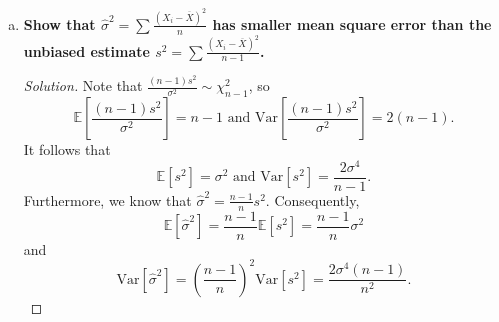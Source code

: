 \documentclass[11pt]{article}
\newenvironment{solution}
  {\renewcommand\qedsymbol{$\blacksquare$}\begin{proof}[Solution]}
  {\end{proof}}
\begin{document}
\begin{enumerate}
\begin{enumerate}[a)]
\begin{solution}
        The first equation is equivalent to $\sum (x_i - \mu) = 0$, so solving for $\mu$ gives
        \[
            \hat{\mu} = \frac{\sum x_i}{n} = \overline{x}.
        \]

        The second equation is equivalent to $\frac{n}{2\sigma^2} = \frac{1}{2\sigma^4} \sum (x_i - \mu)^2$, and solving for $\sigma^2$ gives 
        \begin{align*}
            \sigma^2 &= \frac{\sum (x_i - \mu)^2}{n}.
        \end{align*}
        Plugging in the MLE for $\mu$, we get the MLE for $\hat{\sigma}^2$:
        \begin{align*}
            \hat{\sigma}^2 &= \frac{\sum (x_i - \mu)^2}{n} \\
            &= \frac{1}{n} \left( \sum (x_i - \overline{x} )^2 \right).
        \end{align*}

        Similarly, if we find the MLE for $\sigma$, we get that
        \[
            \frac{\partial l}{\partial \sigma} = -\frac{n}{2} \frac{1}{2\pi \sigma^2} \cdot 4\pi \sigma - \frac{\sum(x_i - \mu)^2}{4\sigma^3}.
        \]
        Equating this to $0$, plugging in $\hat{\mu} = \overline{x}$, and solving for $\sigma$, we find that
        \[
            \sigma^2 = \frac{1}{n} \left( x_i - \overline{x}  \right)^2,
        \]
        so $\hat{\sigma} = \sqrt{\frac{1}{n} \left( x_i - \overline{x}  \right)^2} = \sqrt{\hat{\sigma}^2}$. Thus, the MLE for $\sigma$ is
        the square root of the MLE for $\sigma^2$, as desired. 
        \end{solution}
        
        \item \textbf{Show that $\hat{\sigma}^2 = \sum \frac{(X_i - \overline{X})^2}{n}$ has smaller mean square error than the unbiased estimate
        $s^2 = \sum \frac{(X_i - \overline{X})^2}{n-1}$. }

        \begin{solution}
        Note that $\frac{(n-1)s^2}{\sigma^2} \sim \chi_{n-1}^2$, so
        \[
            \mathbb{E}\left[ \frac{(n-1)s^2}{\sigma^2} \right] = n-1 \text{ and } \mathrm{Var} \left[\frac{(n-1)s^2}{\sigma^2} \right] = 2(n-1).
        \]
        It follows that
        \[
            \mathbb{E}\left[s^2 \right] = \sigma^2 \text{ and } \mathrm{Var} \left[s^2 \right] = \frac{2\sigma^4}{n-1}.
        \]
        Furthermore, we know that $\hat{\sigma}^2 = \frac{n-1}{n}s^2$. Consequently,
        \[
            \mathbb{E}\left[\hat{\sigma}^2 \right] = \frac{n-1}{n} \mathbb{E}\left[s^2 \right] = \frac{n-1}{n}\sigma^2
        \] and
        \[ 
            \mathrm{Var} \left[\hat{\sigma}^2 \right] = \left( \frac{n-1}{n} \right)^2 \mathrm{Var} \left[s^2 \right] = \frac{2\sigma^4 (n-1)}{n^2}.
        \]


\end{solution}
\end{enumerate}
\end{enumerate}
\end{document}

